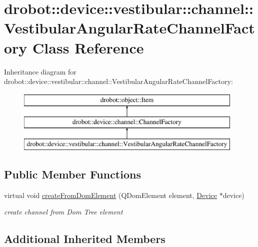 \hypertarget{classdrobot_1_1device_1_1vestibular_1_1channel_1_1VestibularAngularRateChannelFactory}{\section{drobot\-:\-:device\-:\-:vestibular\-:\-:channel\-:\-:Vestibular\-Angular\-Rate\-Channel\-Factory Class Reference}
\label{classdrobot_1_1device_1_1vestibular_1_1channel_1_1VestibularAngularRateChannelFactory}
}
Inheritance diagram for drobot\-:\-:device\-:\-:vestibular\-:\-:channel\-:\-:Vestibular\-Angular\-Rate\-Channel\-Factory\-:\begin{figure}[H]
\begin{center}
\leavevmode
\includegraphics[height=3.000000cm]{classdrobot_1_1device_1_1vestibular_1_1channel_1_1VestibularAngularRateChannelFactory}
\end{center}
\end{figure}
\subsection*{Public Member Functions}
\begin{DoxyCompactItemize}
\item 
virtual void \hyperlink{classdrobot_1_1device_1_1vestibular_1_1channel_1_1VestibularAngularRateChannelFactory_a1a1dbc3b83511d7d50f7ff3e7bb12158}{create\-From\-Dom\-Element} (Q\-Dom\-Element element, \hyperlink{classdrobot_1_1device_1_1Device}{Device} $\ast$device)
\begin{DoxyCompactList}\small\item\em create channel from Dom Tree element \end{DoxyCompactList}\end{DoxyCompactItemize}
\subsection*{Additional Inherited Members}


